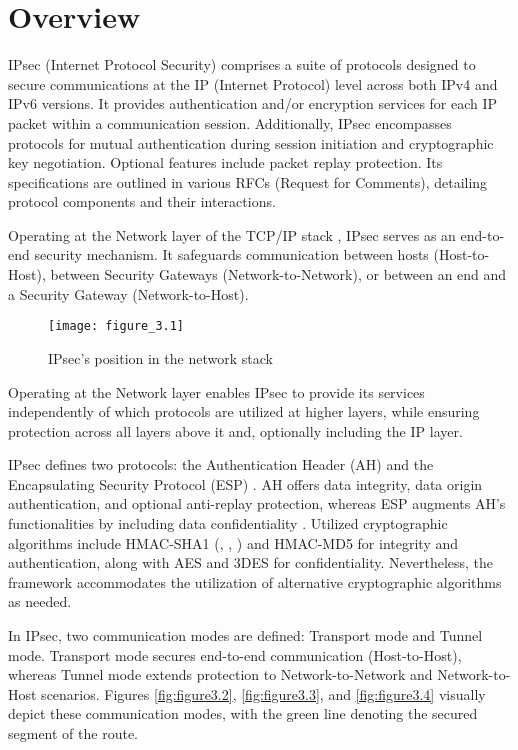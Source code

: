 
\section{Overview}\label{ch:3.1}
IPsec (Internet Protocol Security) comprises a suite of protocols designed to secure communications at the IP (Internet Protocol) level across both IPv4 and IPv6 \cite{rfc2460} versions. It provides authentication and/or encryption services for each IP packet within a communication session. Additionally, IPsec encompasses protocols for mutual authentication during session initiation and cryptographic key negotiation. Optional features include packet replay protection. Its specifications are outlined in various RFCs (Request for Comments), detailing protocol components and their interactions.

Operating at the Network layer of the TCP/IP stack \cite{rfc4301}, IPsec serves as an end-to-end security mechanism. It safeguards communication between hosts (Host-to-Host), between Security Gateways (Network-to-Network), or between an end and a Security Gateway (Network-to-Host).

\begin{figure}[h!]
\centering
\texttt{[image: figure\_3.1]}\\
\caption{IPsec's position in the network stack}
\label{fig:figure3.1}
\end{figure}

Operating at the Network layer enables IPsec to provide its services independently of which protocols are utilized at higher layers, while ensuring protection across all layers above it and, optionally including the IP layer.

IPsec defines two protocols: the Authentication Header (AH) \cite{rfc4302} and the Encapsulating Security Protocol (ESP) \cite{rfc4303}. AH offers data integrity, data origin authentication, and optional anti-replay protection, whereas ESP augments AH's functionalities by including data confidentiality \cite{rfc3602}. Utilized cryptographic algorithms include HMAC-SHA1 (\cite{rfc2104}, \cite{rfc4634}, \cite{rfc2404}) and HMAC-MD5 for integrity and authentication, along with AES \cite{fips197} and 3DES for confidentiality. Nevertheless, the framework accommodates the utilization of alternative cryptographic algorithms as needed.

In IPsec, two communication modes are defined: Transport mode and Tunnel mode. Transport mode secures end-to-end communication (Host-to-Host), whereas Tunnel mode extends protection to Network-to-Network and Network-to-Host scenarios. Figures \ref{fig:figure3.2}, \ref{fig:figure3.3}, and \ref{fig:figure3.4} visually depict these communication modes, with the green line denoting the secured segment of the route.


